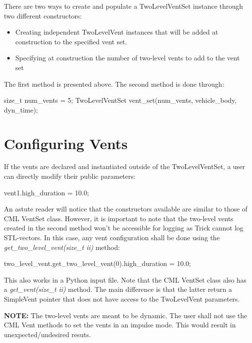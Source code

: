 \documentclass[11pt,fleqn]{report}
\begin{document}
There are two ways to create and populate a TwoLevelVentSet instance through two different constructors:
\begin{itemize}
    \item Creating independent TwoLevelVent instances that will be added at construction to the specified vent set.
    \item Specifying at construction the number of two-level vents to add to the vent set
\end{itemize}

The first method is presented above. The second method is done through:

\begin{codeC}
    size_t num_vents = 5;
    TwoLevelVentSet vent_set(num_vents, vehicle_body, dyn_time);	
\end{codeC}

\section{Configuring Vents}

If the vents are declared and instantiated outside of the TwoLevelVentSet, a user can directly modify their public parameters:

\begin{codeC}
    vent1.high_duration = 10.0;
\end{codeC}

An astute reader will notice that the constructors available are similar to those of CML VentSet class. However, it is important to note 
that the two-level vents created in the second method won't be accessible for logging as Trick cannot log STL-vectors. In this case, any vent 
configuration shall be done using the \emph{get\_two\_level\_vent(size\_t ii)} method:

\begin{codeC}
    two_level_vent.get_two_level_vent(0).high_duration = 10.0;
\end{codeC}

This also works in a Python input file. Note that the CML VentSet class also has a \emph{get\_vent(size\_t ii)} method. The main 
difference is that the latter return a SimpleVent pointer that does not have access to the TwoLevelVent parameters.

\begin{tcolorbox}[colback=lightgray, boxrule=0pt, sharp corners]
\textbf{NOTE:} The two-level vents are meant to be dynamic. The user shall not use the CML Vent methods to set the vents in an 
impulse mode. This would result in unexpected/undesired resuts.
\end{tcolorbox}
\end{document}
